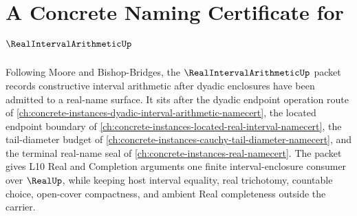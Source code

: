 \chapter{A Concrete Naming Certificate for $\RealIntervalArithmeticUp$}
\label{ch:concrete-instances-real-interval-arithmetic-namecert}

Following Moore and Bishop-Bridges, the $\RealIntervalArithmeticUp$ packet records constructive interval arithmetic after dyadic enclosures have been admitted to a real-name surface. It sits after the dyadic endpoint operation route of \autoref{ch:concrete-instances-dyadic-interval-arithmetic-namecert}, the located endpoint boundary of \autoref{ch:concrete-instances-located-real-interval-namecert}, the tail-diameter budget of \autoref{ch:concrete-instances-cauchy-tail-diameter-namecert}, and the terminal real-name seal of \autoref{ch:concrete-instances-real-namecert}. The packet gives L10 Real and Completion arguments one finite interval-enclosure consumer over $\RealUp$, while keeping host interval equality, real trichotomy, countable choice, open-cover compactness, and ambient Real completeness outside the carrier.

